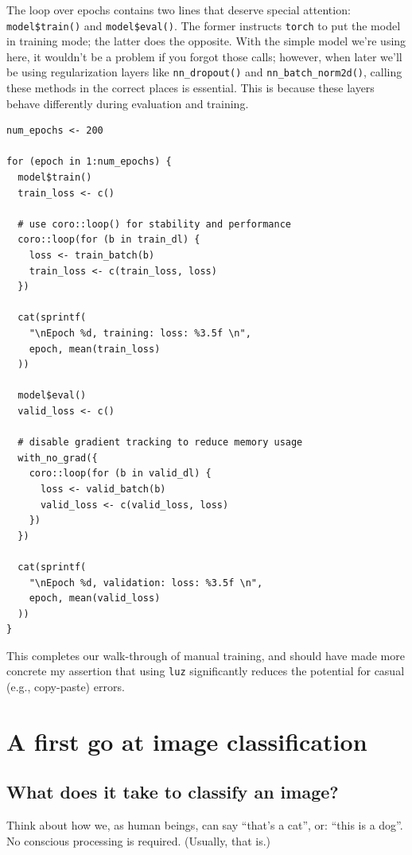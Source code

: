 \documentclass[
  letterpaper,
]{krantz}
\begin{document}
The loop over epochs contains two lines that deserve special attention:
\texttt{model\$train()} and \texttt{model\$eval()}. The former instructs
\texttt{torch} to put the model in training mode; the latter does the
opposite. With the simple model we're using here, it wouldn't be a
problem if you forgot those calls; however, when later we'll be using
regularization layers like \texttt{nn\_dropout()} and
\texttt{nn\_batch\_norm2d()}, calling these methods in the correct
places is essential. This is because these layers behave differently
during evaluation and training.

\begin{verbatim}
num_epochs <- 200

for (epoch in 1:num_epochs) {
  model$train()
  train_loss <- c()

  # use coro::loop() for stability and performance
  coro::loop(for (b in train_dl) {
    loss <- train_batch(b)
    train_loss <- c(train_loss, loss)
  })

  cat(sprintf(
    "\nEpoch %d, training: loss: %3.5f \n",
    epoch, mean(train_loss)
  ))

  model$eval()
  valid_loss <- c()

  # disable gradient tracking to reduce memory usage
  with_no_grad({ 
    coro::loop(for (b in valid_dl) {
      loss <- valid_batch(b)
      valid_loss <- c(valid_loss, loss)
    })  
  })
  
  cat(sprintf(
    "\nEpoch %d, validation: loss: %3.5f \n",
    epoch, mean(valid_loss)
  ))
}
\end{verbatim}

This completes our walk-through of manual training, and should have made
more concrete my assertion that using \texttt{luz} significantly reduces
the potential for casual (e.g., copy-paste) errors.

\hypertarget{sec:image-classification-1}{%
\chapter{A first go at image
classification}\label{sec:image-classification-1}}

\hypertarget{what-does-it-take-to-classify-an-image}{%
\section{What does it take to classify an
image?}\label{what-does-it-take-to-classify-an-image}}

Think about how we, as human beings, can say ``that's a cat'', or:
``this is a dog''. No conscious processing is required. (Usually, that
is.)
\end{document}
